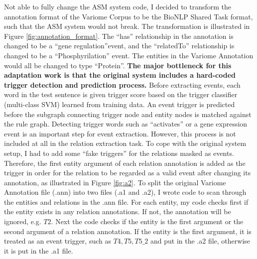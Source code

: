 Not able to fully change the ASM system code, I decided to transform the annotation format of the Variome Corpus to be the BioNLP Shared Task format, such that the ASM system would not break. The transformation is illustrated in Figure \ref{fig:annotation_format}. The ``has'' relationship in the annotation is changed to be a ``gene regulation''event, and the ``relatedTo'' relationship is changed to be a ``Phosphyrilation'' event. The entities in the Variome Annotation would all be changed to type ``Protein''. \textbf{The major bottleneck for this adaptation work is that the original system includes a hard-coded trigger detection and prediction process.} Before extracting events, each word in the test sentence is given trigger score based on the trigger classifier (multi-class SVM) learned from training data. An event trigger is predicted before the subgraph connecting trigger node and entity nodes is matched against the rule graph. Detecting trigger words such as ``activates'' or a gene expression event is an important step for event extraction. However, this process is not included at all in the relation extraction task. To cope with the original system setup, I had to add some ``fake triggers'' for the relations masked as events. Therefore, the first entity argument of each relation annotation is added as the trigger in order for the relation to be regarded as a valid event after changing its annotation, as illustrated in Figure \ref{fig:a2}.\newline\newline
To split the original Variome Annotation file (.ann) into two files (.a1 and .a2), I wrote code to scan through the entities and relations in the .ann file. For each entity, my code checks first if the entity exists in any relation annotations. If not, the annotation will be ignored, e.g. $T2$. Next the code checks if the entity is the first argument or the second argument of a relation annotation. If the entity is the first argument, it is treated as an event trigger, such as $T4, T5, T5\_2$ and put in the .a2 file, otherwise it is put in the .a1 file.
